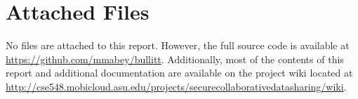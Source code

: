 \section{Attached Files}
	
	No files are attached to this report.  However, the full source code is available at \url{https://github.com/mmabey/bullitt}.  Additionally, most of the contents of this report and additional documentation are available on the project wiki located at \url{http://cse548.mobicloud.asu.edu/projects/securecollaborativedatasharing/wiki}.